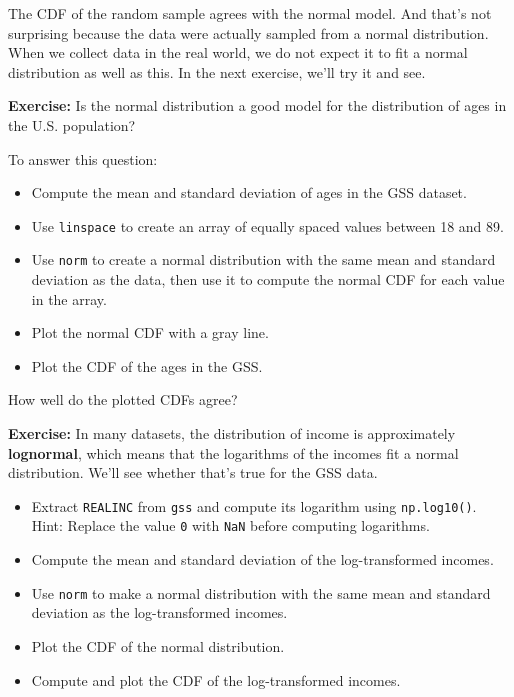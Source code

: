 The CDF of the random sample agrees with the normal model. And that's
not surprising because the data were actually sampled from a normal
distribution. When we collect data in the real world, we do not expect
it to fit a normal distribution as well as this. In the next exercise,
we'll try it and see.

\textbf{Exercise:} Is the normal distribution a good model for the
distribution of ages in the U.S. population?

To answer this question:

\begin{itemize}
\item
  Compute the mean and standard deviation of ages in the GSS dataset.
\item
  Use \passthrough{\lstinline!linspace!} to create an array of equally
  spaced values between 18 and 89.
\item
  Use \passthrough{\lstinline!norm!} to create a normal distribution
  with the same mean and standard deviation as the data, then use it to
  compute the normal CDF for each value in the array.
\item
  Plot the normal CDF with a gray line.
\item
  Plot the CDF of the ages in the GSS.
\end{itemize}

How well do the plotted CDFs agree?

\textbf{Exercise:} In many datasets, the distribution of income is
approximately \textbf{lognormal}, which means that the logarithms of the
incomes fit a normal distribution. We'll see whether that's true for the
GSS data.

\begin{itemize}
\item
  Extract \passthrough{\lstinline!REALINC!} from
  \passthrough{\lstinline!gss!} and compute its logarithm using
  \passthrough{\lstinline!np.log10()!}. Hint: Replace the value
  \passthrough{\lstinline!0!} with \passthrough{\lstinline!NaN!} before
  computing logarithms.
\item
  Compute the mean and standard deviation of the log-transformed
  incomes.
\item
  Use \passthrough{\lstinline!norm!} to make a normal distribution with
  the same mean and standard deviation as the log-transformed incomes.
\item
  Plot the CDF of the normal distribution.
\item
  Compute and plot the CDF of the log-transformed incomes.
\end{itemize}

